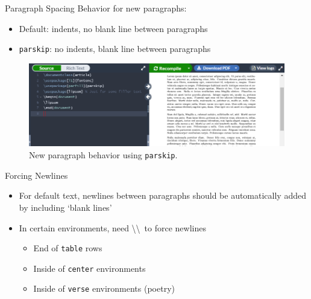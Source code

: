 \documentclass{beamer}
\begin{document}
{  \begin{frame}{Paragraph Spacing}
    Behavior for new paragraphs:
    \begin{itemize}
      \item Default: indents, no blank line between paragraphs
      \item \texttt{parskip}: no indents, blank line between paragraphs
    \end{itemize}
    \begin{figure}
      \includegraphics[width=0.8\linewidth]{day02-02A-parskip.png}
      \caption{New paragraph behavior using \texttt{parskip}.}
      \label{fig:day02-02A}
    \end{figure}
  \end{frame}

  \begin{frame}{Forcing Newlines}
    \begin{itemize}
      \item For default text, newlines between paragraphs should be automatically added by including `blank lines'
      \item In certain environments, need \textbackslash\textbackslash \, to force newlines
      \begin{itemize}
        \item End of \texttt{table} rows
        \item Inside of \texttt{center} environments
        \item Inside of \texttt{verse} environments (poetry)
      \end{itemize}
    \end{itemize}
  \end{frame}

}
\end{document}
